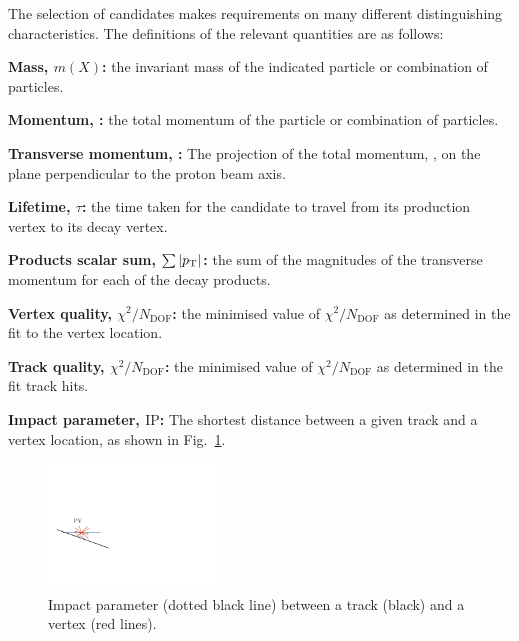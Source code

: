 The selection of candidates makes requirements on many different distinguishing characteristics. The definitions of the relevant quantities are as follows:  
\begin{description}
\item \textbf{Mass, $m(X)$:} the invariant mass of the indicated particle or combination of particles. 
\item \textbf{Momentum, \ptot:} the total momentum of the particle or combination of particles.
\item \textbf{Transverse momentum, \pt:} The projection of the total momentum, \ptot, on the plane perpendicular to the proton beam axis.
\item \textbf{Lifetime, $\tau$:} the time taken for the candidate to travel from its production vertex to its decay vertex.
\item \textbf{Products \pt scalar sum, $\sum{|\pt|}$:} the sum of the magnitudes of the transverse momentum for each of the decay products.
\item \textbf{Vertex quality, $\chi^{2}/N_{\text{DOF}}$:} the minimised value of $\chi^{2}/N_{\text{DOF}}$ as determined in the fit to the vertex location.
\item \textbf{Track quality, $\chi^{2}/N_{\text{DOF}}$:} the minimised value of $\chi^{2}/N_{\text{DOF}}$ as determined in the fit track hits.
\item \textbf{Impact parameter, $\text{IP}$:} The shortest distance between a given track and a vertex location, as shown in Fig.~\ref{fig:impact_parameter}. 

\begin{figure}[!h]
    \centering
    \includegraphics[width=0.4\textwidth]{figs/Selection/Impact_parameter.pdf}
    \caption{Impact parameter (dotted black line) between a track (black) and a vertex (red lines).}
    \label{fig:impact_parameter}   
\end{figure}


\end{description}
